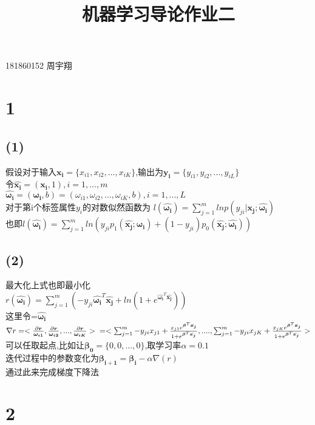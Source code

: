 \documentclass{article}
\title{机器学习导论作业二}
\begin{document}
\maketitle
\begin{center}
181860152 周宇翔
\end{center}
\section*{1}\noindent
\subsection*{(1)}\noindent

假设对于输入$\bm{x_i}=\{x_{i1},x_{i2},...,x_{iK}\}$,输出为$\bm{y_i}=\{y_{i1},y_{i2},...,y_{iL}\}$\\
令$\hat{\bm{x_i}}=(\bm{x_i},1),i=1,...,m$\\
$\hat{\bm{\omega_i}}=(\bm{\omega_i},b)=(\omega_{i1},\omega_{i2},...,\omega_{iK},b),i=1,...,L$\\
对于第i个标签属性$y_i$的对数似然函数为
$l(\hat{\bm{\omega_i}})=\sum_{j=1}^{m}lnp(y_{ji}|\bm{x_j};\hat{\bm{\omega_i}})$\\
也即$l(\hat{\bm{\omega_i}})=\sum_{j=1}^{m}ln(y_{ji}p_1(\hat{\bm{x_j}};\hat{\bm{\omega_i}})+(1-y_{ji})p_0(\hat{\bm{x_j}};\hat{\bm{\omega_i}}))$
\subsection*{(2)}\noindent
最大化上式也即最小化\\
$r(\hat{\bm{\omega_i}})=\sum_{j=1}^{m}(-y_{ji}\hat{\bm{\omega_i}}^T\hat{\bm{x_j}}+ln(1+e^{\hat{\bm{\omega_i}}^T\hat{\bm{x_j}}}))$\\
这里令\bm{$\beta$}=$\hat{\bm{\omega_i}}$\\
$\nabla r=<\frac{\partial\bm{r}}{\bm{\omega_{i1}}},\frac{\partial\bm{r}}{\bm{\omega_{i2}}},...,\frac{\partial\bm{r}}{\bm{\omega_{iK}}}>\\
=<\sum_{j=1}^{m}-y_{ji}x_{j1}+\frac{x_{j1}e^{\bm{\beta}^T\hat{\bm{x_j}}}}{1+e^{\bm{\beta}^T\hat{\bm{x_j}}}},....,\sum_{j=1}^{m}-y_{ji}x_{jK}+\frac{x_{jK}e^{\bm{\beta}^T\hat{\bm{x_j}}}}{1+e^{\bm{\beta}^T\hat{\bm{x_j}}}}>$\\
可以任取起点,比如让$\bm{\beta_0}=\{0,0,...,0\}$,取学习率$\alpha=0.1$\\
迭代过程中的参数变化为$\bm{\beta_{i+1}}=\bm{\beta_i}-\alpha\nabla(r)$\\
通过此来完成梯度下降法
\section*{2}\noindent
\end{document}
